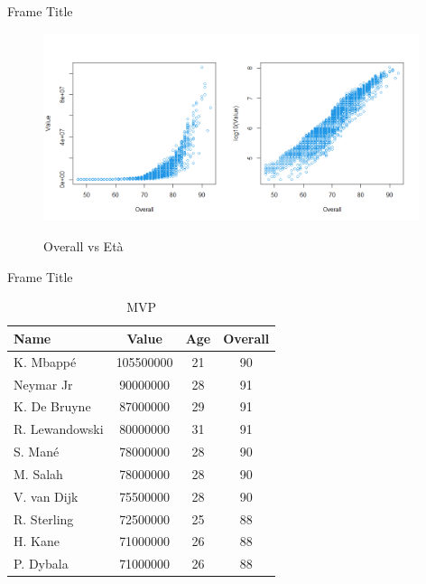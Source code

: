\documentclass[aspectratio=169,xcolor=dvipsnames]{beamer}
\begin{document}
\begin{frame}{Frame Title}
\begin{figure}[H] 
\begin{center} 
  \includegraphics[width=11cm]{Rplot4.png}\\ 
  \caption{Overall vs Età} 
\end{center} 
\end{figure}
\end{frame}


\begin{frame}{Frame Title}
\begin{table}[ht]
\centering
\begin{tabular}{lccc}
  \hline
 Name & Value & Age & Overall \\ 
  \hline
  K. Mbappé & 105500000 &  21 &  90 \\ 
  Neymar Jr & 90000000 &  28 &  91 \\ 
  K. De Bruyne & 87000000 &  29 &  91 \\ 
  R. Lewandowski & 80000000 &  31 &  91 \\ 
  S. Mané & 78000000 &  28 &  90 \\ 
  M. Salah & 78000000 &  28 &  90 \\ 
  V. van Dijk & 75500000 &  28 &  90 \\ 
  R. Sterling & 72500000 &  25 &  88 \\ 
  H. Kane & 71000000 &  26 &  88 \\ 
  P. Dybala & 71000000 &  26 &  88 \\ 
   \hline
\end{tabular}
\caption{MVP}
\end{table}
\end{frame}

\end{document}
